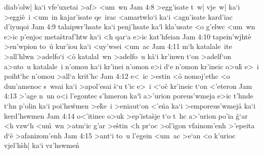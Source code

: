 diab'olw|
ka`i
vfe'uxetai
>af>
<um~wn\bibvsend
\vs Jam 4:8
>egg'isate
t~w|
vje~w|
ka`i
>eggi\r{e}~i
<um~in
kajar'isate
qe~irac
<amartwlo`i
ka`i
<agn'isate
kard'iac
d'iyuqoi\bibvsend
\vs Jam 4:9
talaipwr'hsate
ka`i
penj'hsate
ka`i\r{}
kla'usate
<o
g'elwc
<um~wn
e>ic
p'enjoc
meta\r{s}traf'htw
ka`i
<h
qar`a
e>ic
kat'hfeian\bibvsend
\vs Jam 4:10
tapein'wjht\r{e}
>en'wpion
to~u\r{}
kur'iou
ka`i
<uy'wsei
<um~ac\bibvsend
\vs Jam 4:11
m`h
katalale~ite
>all'hlwn
>adelfo`i
<o\r{}
katalal~wn
>adelfo~u
k\r{a}`i
kr'inwn
t`on
>adelf`on
a>uto~u
katalale~i
n'omou
ka`i
kr'inei
n'omon
e>i
d`e
n'omon
kr'ineic
o>u\r{k}
e>~i
poiht`hc
n'omou
>all`a
krit'hc\bibvsend
\vs Jam 4:12
e<~ic
>estin
<o\r{}
nomoj'ethc
<o
dun'amenoc
s~wsai
ka`i
>apol'esai
\r{s}`u
t'ic
e>~i
<`oc\r{}
kr'ineic
t`on
<'eteron\bibvsend
\vs Jam 4:13
>'age
n~un
o<i
l'egontec
s'hmeron
ka`i\r{}
a>'urion
poreus'wmeja
e>ic
t'hnde
t`hn
p'olin
ka`i
poi'hs\r{w}men
>e\r{k}e~i
>eniaut`on
<'e\r{n}a
ka`i
>emporeus'wmeja\r{}
ka`i
kerd'hswmen\bibvsend
\vs Jam 4:14
o<'itinec
o>uk
>ep'ista\r{s}je
t`o
t~hc
a>'urion
po'ia
\r{g}`ar
<h
vzw`h
<u\r{m}~wn
>atm`ic
g'ar
>e\r{s}tin
<h
pr`oc
>ol'igon
vfainom'enh
>'epeita
d`e\r{}
>afanizom'enh\bibvsend
\vs Jam 4:15
>ant`i
to~u
l'egein
<um~ac
>e`an
<o
k'urioc
vjel'h\r{s}h|
ka`i
vz'hswmen\r{}
